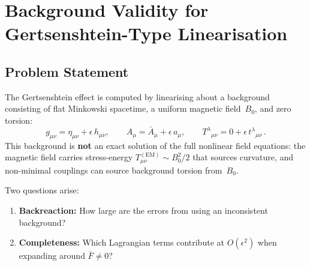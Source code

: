 
\section{Background Validity for Gertsenshtein-Type Linearisation}
\label{sec:background-validity}

\subsection{Problem Statement}
\label{sec:bv-problem}

The Gertsenshtein effect is computed by linearising about a background
consisting of flat Minkowski spacetime, a uniform magnetic field~$B_0$,
and zero torsion:
\begin{equation}
  g_{\mu\nu} = \eta_{\mu\nu} + \epsilon\, h_{\mu\nu}, \qquad
  A_\mu = \bar{A}_\mu + \epsilon\, a_\mu, \qquad
  T^\lambda{}_{\mu\nu} = 0 + \epsilon\, t^\lambda{}_{\mu\nu}\,.
  \label{eq:bv-background}
\end{equation}
This background is \textbf{not} an exact solution of the full nonlinear
field equations: the magnetic field carries stress-energy
$T_{\mu\nu}^{(\mathrm{EM})} \sim B_0^2/2$ that sources curvature, and
non-minimal couplings can source background torsion from~$B_0$.

Two questions arise:
\begin{enumerate}
  \item \textbf{Backreaction:} How large are the errors from using an
    inconsistent background?
  \item \textbf{Completeness:} Which Lagrangian terms contribute at
    $O(\epsilon^2)$ when expanding around $\bar{F} \neq 0$?
\end{enumerate}

